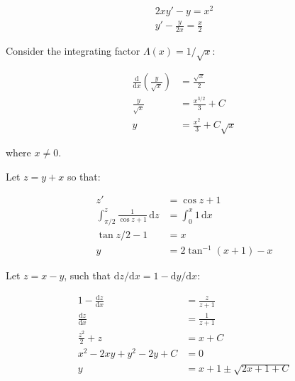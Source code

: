 \documentclass[12pt]{article}
\begin{document}
\begin{equation}
    \begin{split}
        2xy' - y = x^{2} \\
        y' - \frac{y}{2x} = \frac{x}{2}
    \end{split}
\end{equation}

Consider the integrating factor $\Lambda(x) = 1/\sqrt{x}$:

\begin{equation}
    \begin{split}
        \frac{\mathrm{d}}{\mathrm{d}x} \left( \frac{y}{\sqrt{x}} \right) &= \frac{\sqrt{x}}{2} \\
        \frac{y}{\sqrt{x}} &= \frac{x^{3/2}}{3} + C \\
        y &= \frac{x^{2}}{3} + C \sqrt{x}
    \end{split}
\end{equation}

where $x \ne 0$.

Let $z = y + x$ so that:

\begin{equation}
    \begin{split}
        z' &= \cos{z} + 1 \\
        \int_{\pi/2}^{z} \frac{1}{\cos{z} + 1} \, \mathrm{d}z &= \int_{0}^{x} 1 \, \mathrm{d}x \\
        \tan{z/2} - 1 &= x \\
        y &= 2\tan^{-1}{(x + 1)} - x
    \end{split}
\end{equation}

Let $z = x - y$, such that $\mathrm{d}z/\mathrm{d}x = 1 - \mathrm{d}y/\mathrm{d}x$:

\begin{equation}
    \begin{split}
        1  - \frac{\mathrm{d}z}{\mathrm{d}x} &= \frac{z}{z + 1} \\
        \frac{\mathrm{d}z}{\mathrm{d}x} &= \frac{1}{z + 1} \\
        \frac{z^{2}}{2} + z &= x + C \\
        x^{2} - 2xy + y^{2} - 2y + C &= 0 \\
        y &= x + 1 \pm \sqrt{2x + 1 + C}
    \end{split}
\end{equation}

\end{document}
